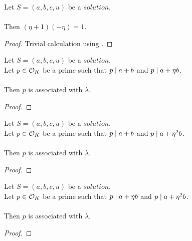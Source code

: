 \begin{lemma}
    \label{lmm:eta_add_one_inv}
    \leanok
    Let $S=(a, b, c, u)$ be a $solution$.\\\\
    Then $(\eta + 1)  (-\eta) = 1$.
\end{lemma}
\begin{proof}
    \leanok
    Trivial calculation using .
\end{proof}

\begin{lemma}
    \label{lmm:associated_of_dvd_a_add_b_of_dvd_a_add_eta_mul_b}
    \leanok
    Let $S=(a, b, c, u)$ be a $solution$.\\
    Let $p \in \mathcal{O}_K$ be a prime such that $p \mid a+b$
    and $p \mid a+\eta  b$.\\\\
    Then $p$ is associated with $\lambda$.
\end{lemma}
\begin{proof}
    \leanok
\end{proof}

\begin{lemma}
    \label{lmm:associated_of_dvd_a_add_b_of_dvd_a_add_eta_sq__mul_b}
    \leanok
    Let $S=(a, b, c, u)$ be a $solution$.\\
    Let $p \in \mathcal{O}_K$ be a prime such that $p \mid a+b$
    and $p \mid a+\eta^2  b$.\\\\
    Then $p$ is associated with $\lambda$.
\end{lemma}
\begin{proof}
    \leanok
\end{proof}

\begin{lemma}
    \label{lmm:associated_of_dvd_a_add_eta_mul_b_of_dvd_a_add_eta_sq__mul_b}
    \leanok
    Let $S=(a, b, c, u)$ be a $solution$.\\
    Let $p \in \mathcal{O}_K$ be a prime such that $p \mid a+\eta  b$
    and $p \mid a+\eta^2  b$.\\\\
    Then $p$ is associated with $\lambda$.
\end{lemma}
\begin{proof}
    \leanok
\end{proof}

